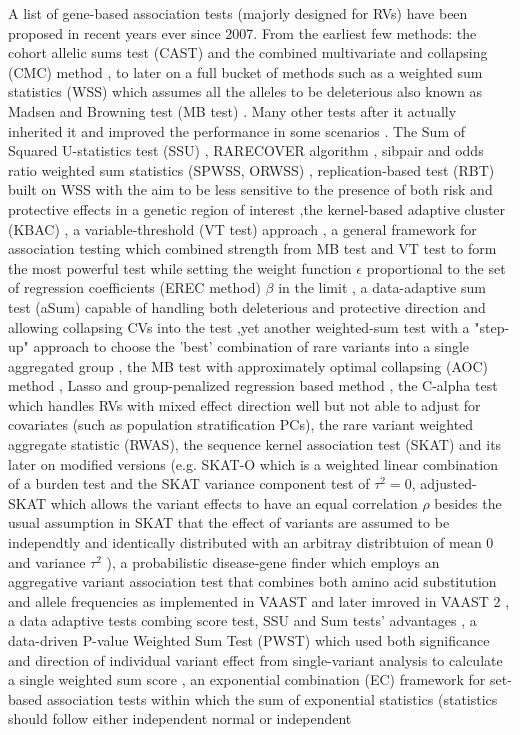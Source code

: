\documentclass[12pt]{article}
\begin{document}
A list of gene-based association tests (majorly designed for RVs) have been proposed in recent years ever since 2007. From the earliest few methods: the cohort allelic sums test (CAST)\cite{Morgenthaler2007} and the combined multivariate and collapsing (CMC) method \cite{Li2008}, to later on a full bucket of methods such as a weighted sum statistics (WSS) which assumes all the alleles to be deleterious also known as Madsen and Browning test (MB test) \cite{Madsen2009}. Many other tests after it actually inherited it and improved the performance in some scenarios \cite{Hoffmann2010,Zhang2010,Ionita-Laza2011,Feng2011}. The Sum of Squared U-statistics test (SSU) \cite{Pan2009}, RARECOVER algorithm \cite{Bhatia2010}, sibpair and odds ratio weighted sum statistics (SPWSS, ORWSS) \cite{Zhu2010,Feng2011}, replication-based test (RBT) built on WSS with the aim to be less sensitive to the presence of both risk and protective effects in a genetic region of interest \cite{Ionita-Laza2011},the kernel-based adaptive cluster (KBAC) \cite{Liu2010}, a variable-threshold (VT test) approach \cite{Price2010}, a general framework for association testing which combined strength from MB test and VT test to form the most powerful test while setting the weight function $\epsilon$ proportional to the set of regression coefficients (EREC method) $\beta$ in the limit \cite{Lin2011},  a data-adaptive sum test (aSum) capable of handling both deleterious and protective direction and allowing collapsing CVs into the test \cite{Han2010},yet another weighted-sum test with a "step-up" approach to choose the 'best' combination of rare variants into a single aggregated group \cite{Hoffmann2010}, the MB test with approximately optimal collapsing (AOC) method \cite{Zhang2010}, Lasso and group-penalized regression based method \cite{Zhou2010}, the C-alpha test which handles RVs with mixed effect direction well but not able to adjust for covariates (such as population stratification PCs)\cite{Neale2011}, the rare variant weighted aggregate statistic (RWAS)\cite{Sul2011}, the sequence kernel association test (SKAT)\cite{Wu2011} and its later on modified versions (e.g. SKAT-O which is a weighted linear combination of a burden test and the SKAT variance component test of $\tau^2 = 0$, adjusted-SKAT which allows the variant effects to have an equal correlation $\rho$ besides the usual assumption in SKAT that the effect of variants are assumed to be independtly and identically distributed with an arbitray distribtuion of mean 0 and variance $\tau^2$  )\cite{Ionita-Laza2013,Oualkacha2013,Lee2012,Lee2012a}, a probabilistic disease-gene finder which employs an aggregative variant association test that combines both amino acid substitution and allele frequencies as implemented in VAAST \cite{Yandell2011} and later imroved in VAAST 2 \cite{Hu2013}, a data adaptive tests combing score test, SSU and Sum tests' advantages \cite{Pan2011}, a data-driven P-value Weighted Sum Test (PWST) which used both significance and direction of individual variant effect from single-variant analysis to calculate a single weighted sum score \cite{Zhang2011}, an exponential combination (EC) framework for set-based association tests within which the sum of exponential statistics (statistics should follow either independent normal or independent 
\end{document}
